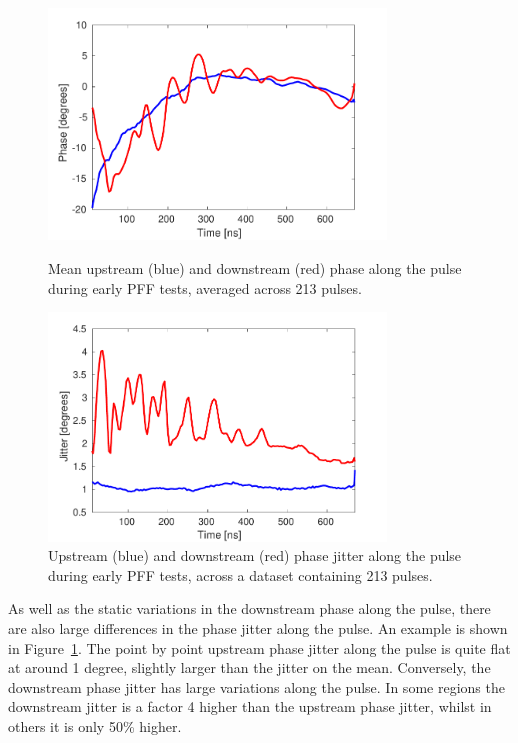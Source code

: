\begin{figure}
  \centering
  \includegraphics[width=0.8\textwidth]{Figures/propagation/origPhaseAlong}
  \caption{Mean upstream (blue) and downstream (red) phase along the pulse during early PFF tests, averaged across 213 pulses.}
  \label{f:origPhaseAlong}
  \includegraphics[width=0.8\textwidth]{Figures/propagation/origJitterAlong}
  \caption{Upstream (blue) and downstream (red) phase jitter along the pulse during early PFF tests, across a dataset containing 213 pulses.}
  \label{f:origJitterAlong}
\end{figure}

As well as the static variations in the downstream phase along the pulse, there are also large differences in the phase jitter along the pulse. An example is shown in Figure~\ref{f:origJitterAlong}. The point by point upstream phase jitter along the pulse is quite flat at around 1 degree, slightly larger than the jitter on the mean. Conversely, the downstream phase jitter has large variations along the pulse. In some regions the downstream jitter is a factor 4 higher than the upstream phase jitter, whilst in others it is only 50\% higher.

